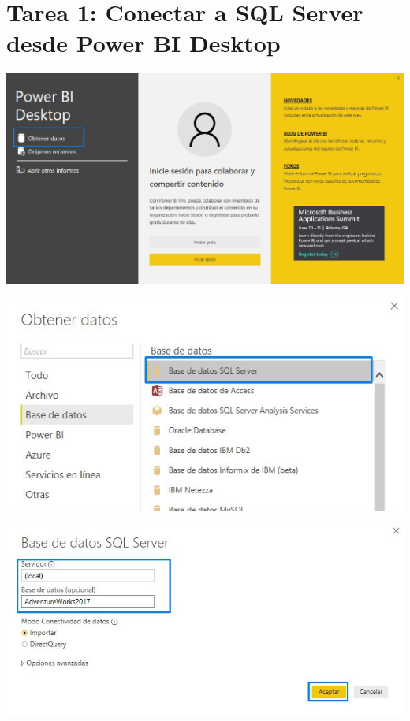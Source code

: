 \section{Tarea 1: Conectar a SQL Server desde Power BI Desktop} 

\begin{center}
\includegraphics[width=\columnwidth]{images/task1/task1-01}\newline
\end{center}

\begin{center}
\includegraphics{images/task1/task1-02}\newline
\end{center}

\begin{center}
\includegraphics[width=\columnwidth]{images/task1/task1-03}\newline
\end{center}

